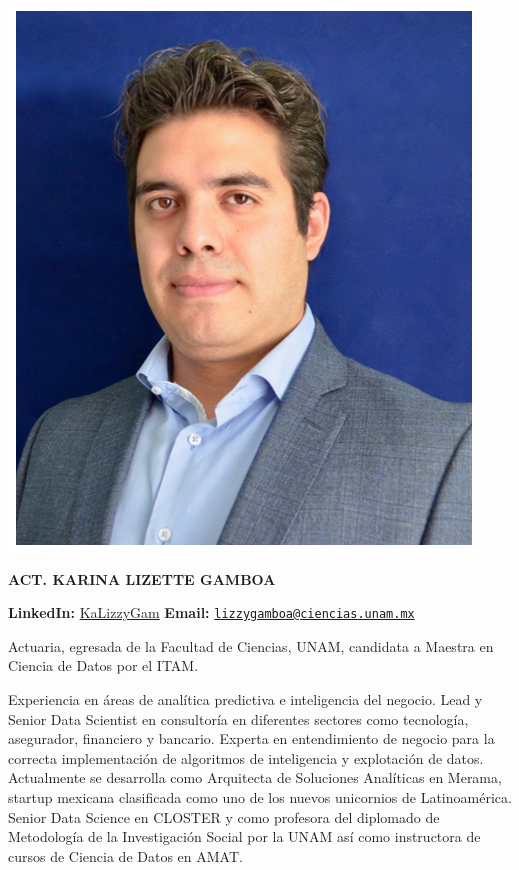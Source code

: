 \documentclass[
]{book}
\begin{document}
\begin{center}\includegraphics{img/00-presentacion/arturo} \end{center}

\textbf{ACT. KARINA LIZETTE GAMBOA}

\textbf{LinkedIn:} \href{https://www.linkedin.com/in/kalizzygam/}{KaLizzyGam}
\textbf{Email:} \href{mailto:lizzygamboa@ciencias.unam.mx}{\nolinkurl{lizzygamboa@ciencias.unam.mx}}

Actuaria, egresada de la Facultad de Ciencias, UNAM, candidata a Maestra en
Ciencia de Datos por el ITAM.

Experiencia en áreas de analítica predictiva e inteligencia del negocio. Lead y Senior
Data Scientist en consultoría en diferentes sectores como tecnología, asegurador,
financiero y bancario. Experta en entendimiento de negocio para la correcta
implementación de algoritmos de inteligencia y explotación de datos.
Actualmente se desarrolla como Arquitecta de Soluciones Analíticas en Merama,
startup mexicana clasificada como uno de los nuevos unicornios de Latinoamérica.
Senior Data Science en CLOSTER y como profesora del diplomado de Metodología
de la Investigación Social por la UNAM así como instructora de cursos de Ciencia de
Datos en AMAT.
\end{document}
